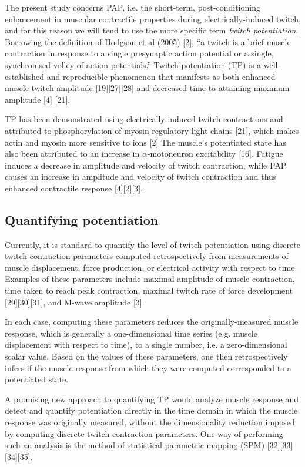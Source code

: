 \documentclass[utf8]{style/FrontiersinHarvard}
\begin{document}
The present study concerns PAP, i.e. the short-term, post-conditioning enhancement in muscular contractile properties during electrically-induced twitch, and for this reason we will tend to use the more specific term \textit{twitch potentiation}.
Borrowing the definition of Hodgson et al (2005) [2],
``a twitch is a brief muscle contraction in response to a single presynaptic action potential or a single, synchronised volley of action potentials.''
Twitch potentiation (TP) is a well-established and reproducible phenomenon that manifests as both enhanced muscle twitch amplitude [19][27][28] and decreased time to attaining maximum amplitude [4] \cite{sale} [21].

TP has been demonstrated using electrically induced twitch contractions and attributed to phosphorylation of myosin regulatory light chains [21], which makes actin and myosin more sensitive to  ions [2]
The muscle's potentiated state has also been attributed to an increase in $ \alpha $-motoneuron excitability [16].
Fatigue induces a decrease in amplitude and velocity of twitch contraction, while PAP causes an increase in amplitude and velocity of twitch contraction and thus enhanced contractile response [4][2][3].

\subsection{Quantifying potentiation}
Currently, it is standard to quantify the level of twitch potentiation using discrete twitch contraction parameters computed retrospectively from measurements of muscle displacement, force production, or electrical activity with respect to time.
Examples of these parameters include maximal amplitude of muscle contraction, time taken to reach peak contraction, maximal twitch rate of force development [29][30][31], and M-wave amplitude [3].

In each case, computing these parameters reduces the originally-measured muscle response, which is generally a one-dimensional time series (e.g. muscle displacement with respect to time), to a single number, i.e. a zero-dimensional scalar value.
Based on the values of these parameters, one then retrospectively infers if the muscle response from which they were computed corresponded to a potentiated state.

A promising new approach to quantifying TP would analyze 
muscle response and detect and quantify potentiation directly in the time domain in which the muscle response was originally measured, without the dimensionality reduction imposed by computing discrete twitch contraction parameters.
One way of performing such an analysis is the method of statistical parametric mapping (SPM) [32][33][34][35].
\end{document}

